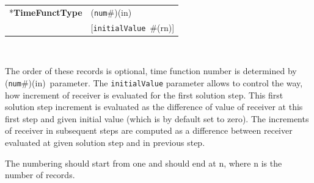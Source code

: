 \documentclass[a4paper]{article}
\makeatletter
\newcommand{\param}[1]{\texttt{#1}} %
\newcommand{\optional}[1]{[#1]} %
\newcommand{\field}[2]{\param{#1}~\#{\tiny(#2)}} %
\newcommand{\optField}[2]{\optional{\field{#1}{#2}}}
\newcommand{\componentNum}{(\param{num}\#){\tiny(in)}} %
\newcommand{\entKeyword}[1]{*\textbf{#1}} %
\newenvironment{record}[1][]{\begin{tabular}{|ll}}{\end{tabular}\\}
\newcommand{\recentry}[2]{{#1}&{#2}\\}
\newcounter{rcc}
\newenvironment{record}[1][\textwidth]{\setcounter{rcc}{0}\begin{tabular*}{#1}{|ll@{\extracolsep{\fill}}r}}{\end{tabular*}\\}
\newcommand{\recentry}[2]{\ifthenelse{\value{rcc}>0}{&$\backslash$ \\}{\setcounter{rcc}{1}}{#1}&{#2}}
\makeatother
\begin{document}
\noindent
\begin{record}
  \recentry{\entKeyword{TimeFunctType}}{\componentNum}
  \recentry{}{\optField{initialValue}{rn}}
\end{record}

The order of these records is optional, time function number is determined by \componentNum\ parameter.
The \param{initialValue} parameter allows to control the way, how increment of receiver is evaluated for the first solution step.
This first solution step increment is evaluated as the difference of value of receiver at this first step and given initial value (which is by default set to zero).
The increments of receiver in subsequent steps are computed as a difference between receiver evaluated at given solution step and in previous step.

The numbering should start from one and should end at n, where n is the number of records.
\end{document}
